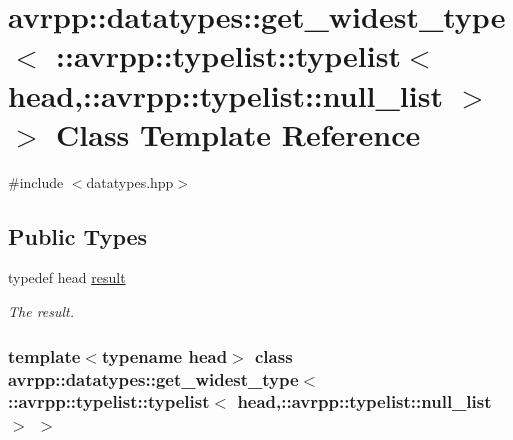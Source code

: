 \hypertarget{classavrpp_1_1datatypes_1_1get__widest__type_3_01_1_1avrpp_1_1typelist_1_1typelist_3_01head_00_17d8c55404f4f223d4953ba4d90da08b2}{
\section{avrpp::datatypes::get\_\-widest\_\-type$<$ ::avrpp::typelist::typelist$<$ head,::avrpp::typelist::null\_\-list $>$ $>$ Class Template Reference}
\label{classavrpp_1_1datatypes_1_1get__widest__type_3_01_1_1avrpp_1_1typelist_1_1typelist_3_01head_00_17d8c55404f4f223d4953ba4d90da08b2}
}


{\ttfamily \#include $<$datatypes.hpp$>$}

\subsection*{Public Types}
\begin{DoxyCompactItemize}
\item 
typedef head \hyperlink{classavrpp_1_1datatypes_1_1get__widest__type_3_01_1_1avrpp_1_1typelist_1_1typelist_3_01head_00_17d8c55404f4f223d4953ba4d90da08b2_a8eed602d964b7fa0c8ff2919786141bc}{result}
\begin{DoxyCompactList}\small\item\em The result. \item\end{DoxyCompactList}\end{DoxyCompactItemize}
\subsubsection*{template$<$typename head$>$ class avrpp::datatypes::get\_\-widest\_\-type$<$ ::avrpp::typelist::typelist$<$ head,::avrpp::typelist::null\_\-list $>$ $>$}



